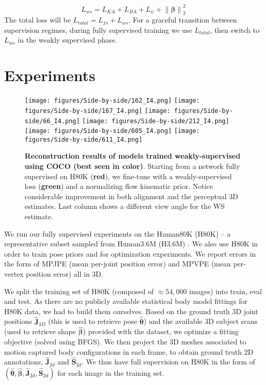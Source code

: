 \documentclass[runningheads]{llncs}
\newcommand{\thetab}{\bm{\theta}}
\newcommand{\betab}{\bm{\beta}}
\begin{document}
\begin{equation}
L_{ws} = L_{KA} + L_{BA} + L_{\psi} + \left\lVert\betab\right\rVert_{2}^{2} \label{eq:ws_loss}
\end{equation}
The total loss will be $L_{total} = L_{fs} + L_{ws}$. For a graceful transition between supervision regimes, during fully supervised training we use $L_{total}$, then switch to $L_{ws}$ in the weakly supervised phase.

\section{Experiments}
\label{sec:exps}

\begin{figure*}[!htbp]
\begin{center}
        \texttt{[image: figures/Side-by-side/162\_I4.png]}
        \texttt{[image: figures/Side-by-side/167\_I4.png]}
        \texttt{[image: figures/Side-by-side/66\_I4.png]}
        \texttt{[image: figures/Side-by-side/212\_I4.png]}
        \texttt{[image: figures/Side-by-side/605\_I4.png]}
        \texttt{[image: figures/Side-by-side/611\_I4.png]}        
\end{center}
\caption{\textbf{Reconstruction results of models trained weakly-supervised using COCO (best seen in color)}. Starting from a network fully supervised on H80K (\textbf{red}), we fine-tune with a weakly-supervised loss (\textbf{green}) and a normalizing flow kinematic prior. Notice considerable improvement in both alignment and the perceptual 3D estimates. Last column shows a different view angle for the WS estimate.}
\label{fig:side-by-side}
\end{figure*}

 We run our fully supervised experiments on the Human80K (H80K) -- a representative subset sampled from Human3.6M (H3.6M) \cite{Ionescu14pami}. We also use H80K in order to train pose priors and for optimization experiments. We report errors in the form of MPJPE (mean per-joint position error) and MPVPE (mean per-vertex position error) all in 3D.

We split the training set of H80K (composed of $\approx54,000$ images) into train, eval and test. As there are no publicly available statistical body model fittings for H80K data, we had to build them ourselves. Based on the ground truth 3D joint positions $\widehat{\mathbf{J}}_{3D}$ (this is used to retrieve pose $\widehat{\thetab}$) and the available 3D subject scans (used to retrieve shape $\widehat{\betab}$) provided with the dataset, we optimize a fitting objective (solved using BFGS). We then project the 3D meshes associated to motion captured body configurations in each frame, to obtain ground truth 2D annotations, $\widehat{\mathbf{J}}_{2d}$ and $\widehat{\mathbf{S}}_{2d}$. We thus have full supervision on H80K in the form of $\left(\widehat{\thetab}, \widehat{\betab}, \widehat{\mathbf{J}}_{2d}, \widehat{\mathbf{S}}_{2d} \right)$ for each image in the training set.
\end{document}
